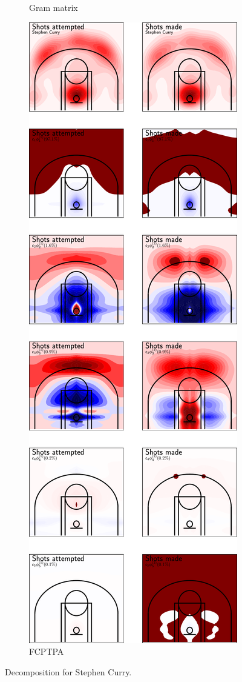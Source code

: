 \begin{figure}
\begin{subfigure}[b]{0.45\textwidth}
        \caption{Gram matrix}
        \label{fig:curry_decomposition}
    \end{subfigure}
    \hfill
    \begin{subfigure}[b]{0.45\textwidth}
        \centering
        \includegraphics[width=\textwidth]{figures/curry_decomposition_fcptpa.pdf}
        \caption{FCPTPA}
        \label{fig:curry_decomposition_fcptpa}
    \end{subfigure}
    \caption{Decomposition for Stephen Curry.}
    \label{fig:curry_shoots_decomposition}
\end{figure}

